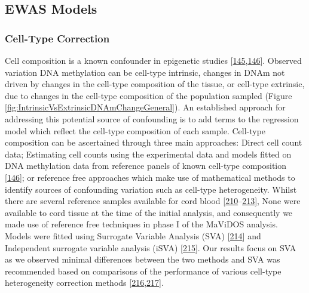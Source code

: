 \documentclass[
]{book}
\begin{document}
\hypertarget{ewas-models}{%
\subsection{EWAS Models}\label{ewas-models}}

\hypertarget{cell-type-correction}{%
\subsubsection{Cell-Type Correction}\label{cell-type-correction}}

Cell composition is a known confounder in epigenetic studies {[}\protect\hyperlink{ref-Jaffe2014}{145},\protect\hyperlink{ref-Houseman2012}{146}{]}.
Observed variation DNA methylation can be cell-type intrinsic, changes in DNAm not driven by changes in the cell-type composition of the tissue, or cell-type extrinsic, due to changes in the cell-type composition of the population sampled (Figure \ref{fig:IntrinsicVsExtrinsicDNAmChangeGeneral}).
An established approach for addressing this potential source of confounding is to add terms to the regression model which reflect the cell-type composition of each sample.
Cell-type composition can be ascertained through three main approaches: Direct cell count data; Estimating cell counts using the experimental data and models fitted on DNA methylation data from reference panels of known cell-type composition {[}\protect\hyperlink{ref-Houseman2012}{146}{]}; or reference free approaches which make use of mathematical methods to identify sources of confounding variation such as cell-type heterogeneity.
Whilst there are several reference samples available for cord blood {[}\protect\hyperlink{ref-Cardenas2016}{210}--\protect\hyperlink{ref-Gervin2016}{213}{]}, None were available to cord tissue at the time of the initial analysis, and consequently we made use of reference free techniques in phase I of the MaViDOS analysis.
Models were fitted using Surrogate Variable Analysis (SVA) {[}\protect\hyperlink{ref-Leek2007}{214}{]} and Independent surrogate variable analysis (iSVA) {[}\protect\hyperlink{ref-Teschendorff2011}{215}{]}.
Our results focus on SVA as we observed minimal differences between the two methods and SVA was recommended based on comparisons of the performance of various cell-type heterogeneity correction methods {[}\protect\hyperlink{ref-McGregor2016}{216},\protect\hyperlink{ref-Teschendorff2017}{217}{]}.
\end{document}

